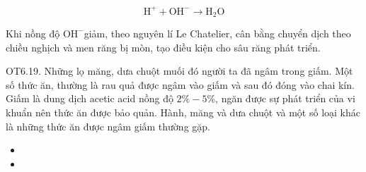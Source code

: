 \documentclass[10pt]{article}
\begin{document}
$$
\mathrm{H}^{+}+\mathrm{OH}^{-} \rightarrow \mathrm{H}_{2} \mathrm{O}
$$

Khi nồng độ $\mathrm{OH}^{-}$giảm, theo nguyên lí Le Chatelier, cân bằng chuyển dịch theo chiều nghịch và men răng bị mòn, tạo điều kiện cho sâu răng phát triển.

OT6.19. Những lọ măng, dưa chuột muối đó người ta đã ngâm trong giấm. Một số thức ăn, thường là rau quả được ngâm vào giấm và sau đó đóng vào chai kín. Giấm là dung dịch acetic acid nồng độ $2 \%-5 \%$, ngăn được sự phát triển của vi khuẩn nên thức ăn được bảo quản. Hành, măng và dưa chuột và một số loại khác là những thức ăn được ngâm giấm thường gặp.

\begin{itemize}
  \item 
  \item 
\end{itemize}
\end{document}
